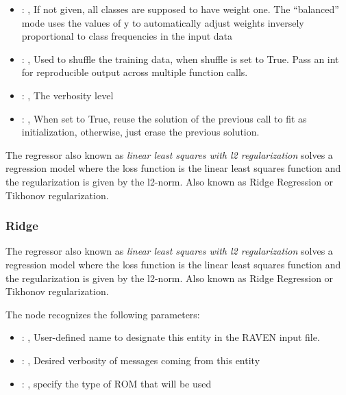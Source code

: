 \begin{itemize}
    \item {}: \xmlDesc{[balanced]}, 
      If not given, all classes are supposed to have weight one.
      The “balanced” mode uses the values of y to automatically adjust weights
      inversely proportional to class frequencies in the input data

    \item {}: , 
      Used to shuffle the training data, when shuffle is set to
      True. Pass an int for reproducible output across multiple function calls.

    \item {}: , 
      The verbosity level

    \item {}: , 
      When set to True, reuse the solution of the previous call
      to fit as initialization, otherwise, just erase the previous solution.
  \end{itemize}
 The  regressor also known as                              \textit{linear least
 squares with l2 regularization} solves a regression                              model where the
 loss function is the linear least squares function and the
 regularization is given by the l2-norm.                              Also known as Ridge Regression
 or Tikhonov regularization.                              

\subsubsection{Ridge}
  The  regressor also known as                              \textit{linear least
  squares with l2 regularization} solves a regression                              model where the
  loss function is the linear least squares function and the
  regularization is given by the l2-norm.                              Also known as Ridge
  Regression or Tikhonov regularization.

  The  node recognizes the following parameters:
    \begin{itemize}
      \item {}: , 
        User-defined name to designate this entity in the RAVEN input file.
      \item {}: , 
        Desired verbosity of messages coming from this entity
      \item {}: , 
        specify the type of ROM that will be used
  \end{itemize}

